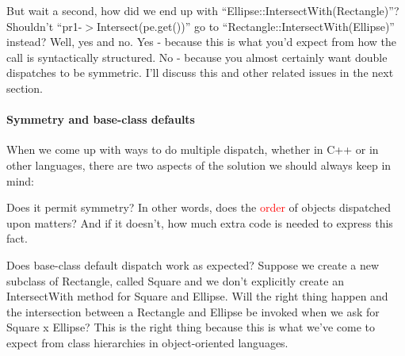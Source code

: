 \documentclass{book}
\begin{document}
But wait a second, how did we end up with ``Ellipse::IntersectWith(Rectangle)''? Shouldn't ``pr1-$>$Intersect(pe.get())'' go to ``Rectangle::IntersectWith(Ellipse)'' instead? Well, yes and no.
Yes - because this is what you'd expect from how the call is syntactically structured.
No - because you almost certainly want double dispatches to be symmetric. I'll discuss this and other related issues in the next section.
\paragraph{Symmetry and base-class defaults}

When we come up with ways to do multiple dispatch, whether in C++ or in other languages, there are two aspects of the solution we should always keep in mind:

    Does it permit symmetry? In other words, does the \textcolor{red}{order} of objects dispatched upon matters? And if it doesn't, how much extra code is needed to express this fact.

    Does base-class default dispatch work as expected? Suppose we create a new subclass of Rectangle, called Square and we don't explicitly create an IntersectWith method for Square and Ellipse.
    Will the right thing happen and the intersection between a Rectangle and Ellipse be invoked when we ask for Square x Ellipse?
    This is the right thing because this is what we've come to expect from class hierarchies in object-oriented languages.
\end{document}
